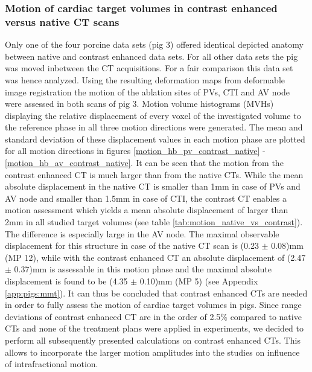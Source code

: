 \documentclass[type=dr, dr=rernat, accentcolor=tud7b,colorbacktitle, bigchapter, openright, twoside, 12pt ]{tudthesis}
\begin{document}
\subsubsection*{Motion of cardiac target volumes in contrast enhanced versus native CT scans}
Only one of the four porcine data sets (pig 3) offered identical depicted anatomy between native and contrast enhanced data sets. For all 
other data sets the pig was moved inbetween the CT acquisitions. For a fair comparison this data set was hence analyzed. 
Using the resulting deformation maps from deformable image registration the motion of the ablation sites of PVs, CTI and AV node were assessed 
in both scans of pig 3. Motion volume histograms (MVHs) \cite{Ric13} displaying the relative displacement of every voxel of the investigated 
volume to the reference phase in all three motion directions were generated. The mean and standard deviation of these displacement values in 
each motion phase are plotted for all motion directions in figures \ref{motion_hb_pv_contrast_native} - \ref{motion_hb_av_contrast_native}.
It can be seen that the motion from the contrast enhanced CT is much larger than from the native CTs. While the mean absolute 
displacement in the native CT is smaller than 1mm in case of PVs and AV node and smaller than 1.5mm in case of CTI, the contrast CT enables a 
motion assessment which yields a mean absolute displacement of larger than 2mm in all studied target volumes (see table \ref{tab:motion_native_vs_contrast}). 
The difference is especially large in the AV node. The maximal observable displacement for this structure in case of the native CT scan is 
(0.23 $\pm$ 0.08)mm (MP 12), while with the contrast enhanced CT an absolute displacement of (2.47 $\pm$ 0.37)mm is 
assessable in this motion phase and the maximal absolute displacement is found to be (4.35 $\pm$ 0.10)mm (MP 5) (see Appendix \ref{app:pigs:mmt}). 
It can thus be concluded that contrast enhanced CTs are needed in order to fully assess the motion of cardiac target volumes in pigs. 
Since range deviations of contrast enhanced CT are in the order of 2.5\% compared to native CTs \cite{Wer04} and none of the treatment plans 
were applied in experiments, we decided to perform all subsequently presented calculations on contrast enhanced CTs. This allows to incorporate 
the larger motion amplitudes into the studies on influence of intrafractional motion. 

% 
\vspace*{1cm}
\end{document}
